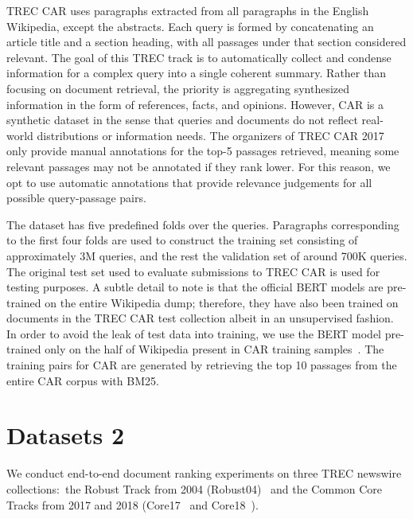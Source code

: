 TREC CAR \cite{dietz2017trec} uses paragraphs extracted from all paragraphs in the English Wikipedia, except the abstracts.
Each query is formed by concatenating an article title and a section heading, with all passages under that section considered relevant.
The goal of this TREC track is to automatically collect and condense information for a complex query into a single coherent summary.
Rather than focusing on document retrieval, the priority is aggregating synthesized information in the form of references, facts, and opinions.
However, CAR is a synthetic dataset in the sense that queries and documents do not reflect real-world distributions or information needs.
The organizers of TREC CAR 2017 only provide manual annotations for the top-5 passages retrieved, meaning some relevant passages may not be annotated if they rank lower.
For this reason, we opt to use automatic annotations that provide relevance judgements for all possible query-passage pairs.

The dataset has five predefined folds over the queries.
Paragraphs corresponding to the first four folds are used to construct the training set consisting of approximately 3M queries, and the rest the validation set of around 700K queries.
The original test set used to evaluate submissions to TREC CAR is used for testing purposes.
A subtle detail to note is that the official BERT models are pre-trained on the entire Wikipedia dump; therefore, they have also been trained on documents in the TREC CAR test collection albeit in an unsupervised fashion.
In order to avoid the leak of test data into training, we use the BERT model pre-trained only on the half of Wikipedia present in CAR training samples~\cite{nogueira2019passage}.
The training pairs for CAR are generated by retrieving the top 10 passages from the entire CAR corpus with BM25.


\section{Datasets 2}

We conduct end-to-end document ranking experiments on three TREC newswire collections:\ the Robust Track from 2004 (Robust04)~\cite{Voorhees_TREC2004_robust} and the Common Core Tracks from 2017 and 2018 (Core17~\cite{allan2017trec} and Core18~\cite{core2018trec}).

